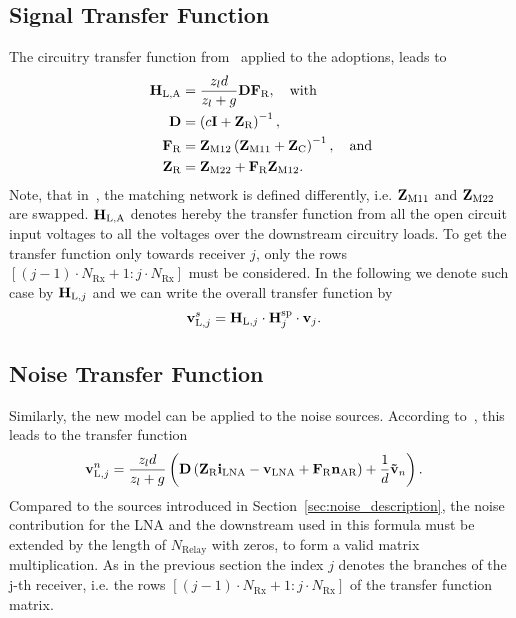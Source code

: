 \subsection{Signal Transfer Function}
The circuitry transfer function from~\cite{Nossek} applied to the adoptions, leads to
\begin{align}
\label{eq:nossek_transf}
\mathbf{H}_\text{L,A} &= \frac{z_l d}{z_l + g}\mathbf{D}\mathbf{F}_\text{R},\quad\text{with}\\
\label{eq:nossek_D}
\mathbf{D} &= \left(c\mathbf{I} + \mathbf{Z}_\text{R}\right)^{-1},\\
\label{eq:nossek_F}
\mathbf{F}_\text{R} &= \mathbf{Z}_\text{M12}\left(\mathbf{Z}_\text{M11}+\mathbf{Z}_\text{C}\right)^{-1},\quad\text{and}\\
\label{eq:nossek_Zr}
\mathbf{Z}_\text{R} &= \mathbf{Z}_\text{M22} + \mathbf{F}_\text{R}\mathbf{Z}_\text{M12}.
\end{align}
Note, that in~\cite{Nossek}, the matching network is defined differently, i.e. $\mathbf{Z}_\text{M11}$ and $\mathbf{Z}_\text{M22}$ are swapped.
$\mathbf{H}_\text{L,A}$ denotes hereby the transfer function from all the open circuit input voltages to all the voltages over the downstream circuitry loads.
To get the transfer function only towards receiver $j$, only the rows $\left[(j-1)\cdot N_\text{Rx}+1 : j\cdot N_\text{Rx}\right]$ must be considered.
In the following we denote such case by $\mathbf{H}_{\text{L,}j}$ and we can write the overall transfer function by
\begin{align}
\mathbf{v}_{\text{L},j}^s &= \mathbf{H}_{\text{L,}j}\cdot\mathbf{H}_{j}^{\text{sp}}\cdot\mathbf{v}_j.
\end{align}

\subsection{Noise Transfer Function}
Similarly, the new model can be applied to the noise sources.
According to~\cite[Equation (14)]{Yahia2013}, this leads to the transfer function
\begin{align}
\mathbf{v}_{\text{L},j}^n &= \frac{z_l d}{z_l +g}\left(\mathbf{D}\left(\mathbf{Z}_\text{R}\mathbf{i}_\text{LNA} - \mathbf{v}_\text{LNA} +\mathbf{F}_\text{R}\mathbf{n}_\text{AR}\right) + \frac{1}{d}\mathbf{\tilde{v}}_n\right).
\end{align}
Compared to the sources introduced in Section~\ref{sec:noise_description}, the noise contribution for the LNA and the downstream used in this formula must be extended by the length of $N_\text{Relay}$ with zeros, to form a valid matrix multiplication.
As in the previous section the index $j$ denotes the branches of the j-th receiver, i.e. the rows $\left[(j-1)\cdot N_\text{Rx}+1 : j\cdot N_\text{Rx}\right]$ of the transfer function matrix.

